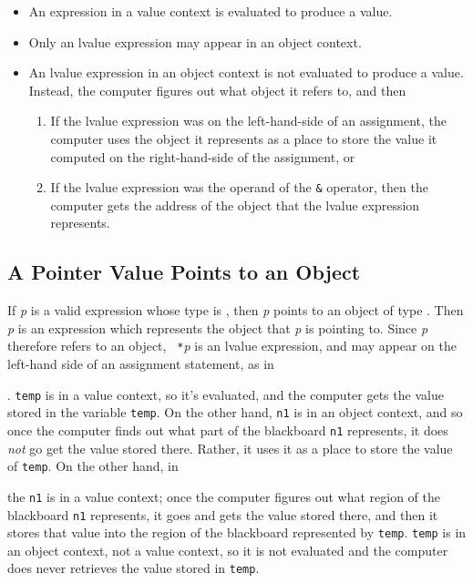 \begin{itemize}
\item An expression in a value context is evaluated to produce a value.
\item Only an lvalue expression may appear in an object context.   
\item An lvalue expression in an object context is not evaluated to
produce a value.  Instead, the computer figures out what object it
refers to, and then
\begin{enumerate}
\item If the lvalue expression was on the left-hand-side of an assignment, the
computer uses the object it represents as a place to store the value it
computed on the right-hand-side of the assignment, or
\item If the lvalue expression was the operand of the {\tt\&} operator, then the
computer gets the address of the object that the lvalue expression represents.
\end{enumerate}
\end{itemize}

\subsection{ A Pointer Value Points to an Object}

If {\em p}\/ is a valid expression whose type is , then
{\em p}\/ points to an object of type . Then {\tt *}{\em
p}\/ is an expression which represents the object that {\em p}\/ is
pointing to.  Since {\tt *}{\em p}\/ therefore refers to an object, {\tt
*}{\em p}\/ is an lvalue expression, and may appear on the left-hand
side of an assignment statement, as in

\begin{flushleft}
\verb% *n1 = temp ;  %
\end{flushleft}

\noindent .  {\tt temp} is in a value context, so it's evaluated, and
the computer gets the value stored in the variable {\tt temp}.  On the
other hand, {\tt *n1} is in an object context, and so once the computer
finds out what part of the blackboard {\tt *n1} represents, it does {\em
not} go get the value stored there.  Rather, it uses it as a place to
store the value of {\tt temp}.  On the other hand, in

\begin{flushleft}
\verb% temp = *n1 ; %
\end{flushleft}

\noindent the {\tt *n1} is in a value context;  once the computer
figures out what region of the blackboard {\tt *n1} represents, it goes
and gets the value stored there, and then it stores that value into the
region of the blackboard represented by {\tt temp}.  {\tt temp} is in an
object context, not a value context, so it is not evaluated and the
computer does never retrieves the value stored in {\tt temp}.

